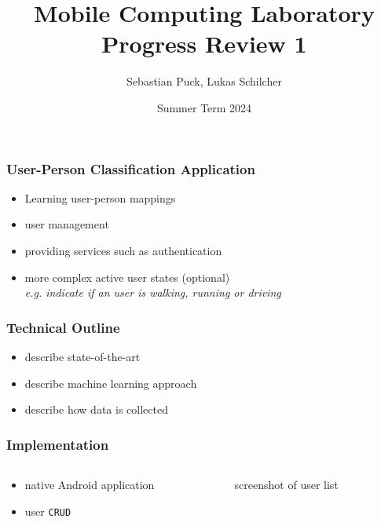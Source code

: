 \documentclass{beamer}
\title{Mobile Computing Laboratory\\Progress Review 1}
\author{Sebastian Puck, Lukas Schilcher}
\date{Summer Term 2024}
\begin{document}
\begin{frame}
    \maketitle
\end{frame}

\begin{frame}
    \frametitle{User-Person Classification Application}
    \begin{itemize}
        \item Learning user-person mappings
        \item user management
        \item providing services such as authentication
        \item more complex active user states (optional)\\
        \textit{e.g. indicate if an user is walking, running or driving}
    \end{itemize}
\end{frame}

\begin{frame}
    \frametitle{Technical Outline}
    \begin{itemize}
        \item describe state-of-the-art
        \item describe machine learning approach
        \item describe how data is collected
    \end{itemize}
\end{frame}

\begin{frame}
    \frametitle{Implementation}
    \begin{columns}
        \begin{column}{.5\textwidth}
            \begin{itemize}
                \item native Android application
                \item user \texttt{CRUD}
            \end{itemize}
        \end{column}
        \begin{column}{.5\textwidth}
            screenshot of user list
        \end{column}
    \end{columns}
\end{frame}
\end{document}
